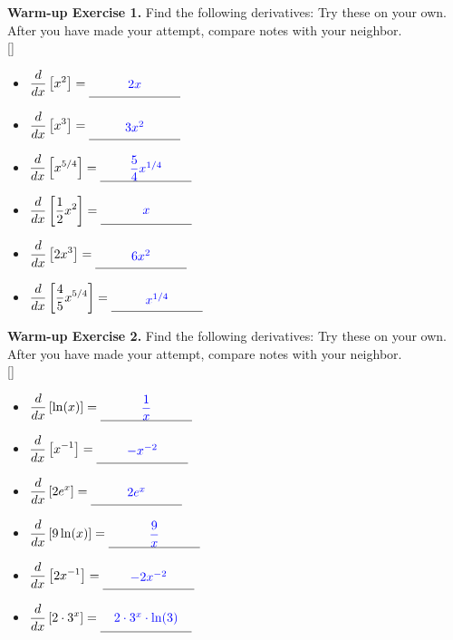 \documentclass[10pt]{article}
\begin{document}

{\bf\color{blue} Warm-up Exercise 1.} Find the following derivatives: Try these on your own. After you have made your attempt, compare notes with your neighbor.\\

[\hfill]{
        \begin{itemize}
        \item $\ds \dfrac{d}{dx}\left[ x^2\right] = \unlineb{1}{2x}$
        \item $\ds \dfrac{d}{dx}\left[ x^3\right] = \unlineb{1}{3x^2}$
        \item $\ds \dfrac{d}{dx}\left[ x^{5/4}\right] = \unlineb{1}{\dfrac{5}{4}x^{1/4}}$
        \end{itemize}
}{
     \begin{itemize}
        \item $\ds \dfrac{d}{dx}\left[ \frac12x^2\right] = \unlineb{1}{x}$
        \item $\ds \dfrac{d}{dx}\left[ 2x^3\right] = \unlineb{1}{6x^2}$
        \item $\ds \dfrac{d}{dx}\left[ \dfrac45x^{5/4}\right] = \unlineb{1}{x^{1/4}}$
        \end{itemize}
}
\vfill
{\bf\color{blue} Warm-up Exercise 2.} Find the following derivatives: Try these on your own. After you have made your attempt, compare notes with your neighbor.\\
[\hfill]{
\begin{itemize}
        \item $\ds \dfrac{d}{dx}\left[ \ln(x)\right] = \unlineb{1}{\dfrac{1}{x}}$
        \item $\ds \dfrac{d}{dx}\left[ x^{-1}\right] = \unlineb{1}{-x^{-2}}$
           \item $\ds \dfrac{d}{dx}\left[ 2 e^x\right] = \unlineb{1}{2e^x}$
        \end{itemize}
}{
\begin{itemize}
        \item $\ds \dfrac{d}{dx}\left[ 9\ln(x)\right] = \unlineb{1}{\dfrac{9}{x}}$
        \item $\ds \dfrac{d}{dx}\left[ 2x^{-1}\right] = \unlineb{1}{-2x^{-2}}$
                   \item $\ds \dfrac{d}{dx}\left[ 2 \cdot 3^x\right] = \unlineb{1}{2\cdot 3^x\cdot\ln(3)}$
        \end{itemize}
}
\end{document}

